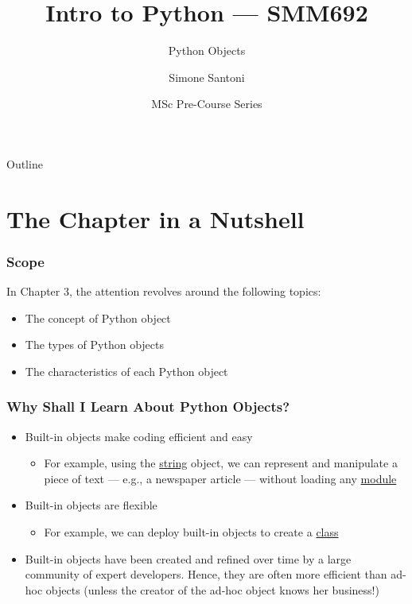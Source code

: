 \documentclass[aspectratio=1610]{beamer}
\title{Intro to Python --- SMM692}
\subtitle{Python Objects}
\author{Simone Santoni}
\institute{Bayes Business School}
\date{MSc Pre-Course Series}
\begin{document}
\begin{frame}
	\titlepage
\end{frame}

\begin{frame}{Outline}
	\tableofcontents
\end{frame}


\section{The Chapter in a Nutshell}

\begin{frame}
    \frametitle{Scope}
    In Chapter 3, the attention revolves around the following topics:

    \begin{itemize}
        \item The concept of Python object 
        \item The types of Python objects
        \item The characteristics of each Python object
    \end{itemize}
\end{frame}

\begin{frame}
    \frametitle{Why Shall I Learn About Python Objects?}
    \begin{itemize}
    	\item Built-in objects make coding efficient and easy
        \begin{itemize}
            \item  For example, using the \href{https://docs.python.org/3/tutorial/introduction.html\#strings}{string} object, we can represent and manipulate a piece of text --- e.g., a newspaper article --- without loading any \href{https://docs.python.org/3/tutorial/modules.html}{module}
        \end{itemize}
           	\item Built-in objects are flexible
            \begin{itemize}
                \item For example, we can deploy built-in objects to create a \href{https://docs.python.org/3/tutorial/classes.html}{class}
            \end{itemize}
    	\item Built-in objects have been created and refined over time by a large community of expert developers. Hence, they are  often  more  efficient  than  ad-hoc objects (unless the creator of the ad-hoc object knows her business!)
    \end{itemize}
\end{frame}
\end{document}
